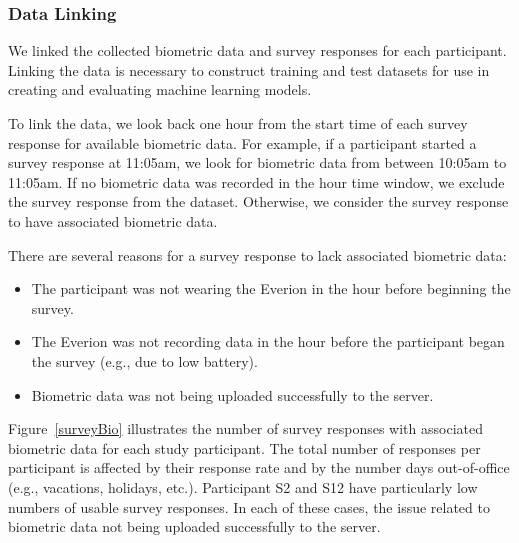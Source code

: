 \subsubsection{Data Linking}

We linked the collected biometric data and survey responses for each participant. Linking the data is necessary to construct training and test datasets for use in creating and evaluating machine learning models.

To link the data, we look back one hour from the start time of each survey response for
available biometric data.  For example, if a participant started a survey response at 11:05am, we look for biometric data from between 10:05am to 11:05am. If no biometric data was recorded in the hour time window, we exclude the survey response from the dataset. Otherwise, we consider the survey response to have associated biometric data.

There are several reasons for a survey response to lack associated biometric data:
\begin{itemize}
\item The participant was not wearing the Everion in the hour before beginning the survey.
\item The Everion was not recording data in the hour before the participant began the survey (e.g., due to low battery).
\item Biometric data was not being uploaded successfully to the server.
\end{itemize}

Figure~\ref{surveyBio} illustrates the number of survey responses with associated biometric data for each study participant. 
The total number of responses per participant is affected by their response rate and by the number days out-of-office (e.g., vacations, holidays, etc.). 
Participant S2 and S12 have particularly low numbers of usable survey responses. In each of these cases, the issue related to biometric data not being uploaded successfully to the server.

